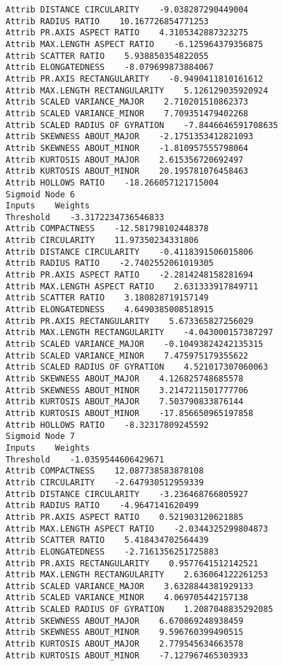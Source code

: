 \documentclass[
	article,			%
	11pt,				%
	oneside,			%
	a4paper,			%
	english,			%
	brazil,				%
	sumario=tradicional
	]{abntex2}
\begin{document}
\begin{lstlisting}
Attrib DISTANCE CIRCULARITY    -9.038287290449004
Attrib RADIUS RATIO    10.167726854771253
Attrib PR.AXIS ASPECT RATIO    4.3105342887323275
Attrib MAX.LENGTH ASPECT RATIO    -6.125964379356875
Attrib SCATTER RATIO    5.938850354822055
Attrib ELONGATEDNESS    -8.079699873884067
Attrib PR.AXIS RECTANGULARITY    -0.9490411810161612
Attrib MAX.LENGTH RECTANGULARITY    5.126129035920924
Attrib SCALED VARIANCE_MAJOR    2.710201510862373
Attrib SCALED VARIANCE_MINOR    7.709351479402268
Attrib SCALED RADIUS OF GYRATION    -7.8446646591708635
Attrib SKEWNESS ABOUT_MAJOR    -2.1751353412821093
Attrib SKEWNESS ABOUT_MINOR    -1.810957555798064
Attrib KURTOSIS ABOUT_MAJOR    2.615356720692497
Attrib KURTOSIS ABOUT_MINOR    20.195781076458463
Attrib HOLLOWS RATIO    -18.266057121715004
Sigmoid Node 6
Inputs    Weights
Threshold    -3.3172234736546833
Attrib COMPACTNESS    -12.581798102448378
Attrib CIRCULARITY    11.97350234331806
Attrib DISTANCE CIRCULARITY    -0.4118391506015806
Attrib RADIUS RATIO    -2.7402552061019305
Attrib PR.AXIS ASPECT RATIO    -2.2814248158281694
Attrib MAX.LENGTH ASPECT RATIO    2.631333917849711
Attrib SCATTER RATIO    3.180828719157149
Attrib ELONGATEDNESS    4.6490385008518915
Attrib PR.AXIS RECTANGULARITY    5.673365827256029
Attrib MAX.LENGTH RECTANGULARITY    -4.043000157387297
Attrib SCALED VARIANCE_MAJOR    -0.10493824242135315
Attrib SCALED VARIANCE_MINOR    7.475975179355622
Attrib SCALED RADIUS OF GYRATION    4.521017307060063
Attrib SKEWNESS ABOUT_MAJOR    4.126825748685578
Attrib SKEWNESS ABOUT_MINOR    3.2147211501777706
Attrib KURTOSIS ABOUT_MAJOR    7.503790833876144
Attrib KURTOSIS ABOUT_MINOR    -17.856650965197858
Attrib HOLLOWS RATIO    -8.32317809245592
Sigmoid Node 7
Inputs    Weights
Threshold    -1.0359544606429671
Attrib COMPACTNESS    12.087738583878108
Attrib CIRCULARITY    -2.647930512959339
Attrib DISTANCE CIRCULARITY    -3.236468766805927
Attrib RADIUS RATIO    -4.9647141620499
Attrib PR.AXIS ASPECT RATIO    0.521903120621885
Attrib MAX.LENGTH ASPECT RATIO    -2.0344325299804873
Attrib SCATTER RATIO    5.418434702564439
Attrib ELONGATEDNESS    -2.7161356251725883
Attrib PR.AXIS RECTANGULARITY    0.9577641512142521
Attrib MAX.LENGTH RECTANGULARITY    2.636064122261253
Attrib SCALED VARIANCE_MAJOR    3.6328844381929133
Attrib SCALED VARIANCE_MINOR    4.069705442157138
Attrib SCALED RADIUS OF GYRATION    1.2087048835292085
Attrib SKEWNESS ABOUT_MAJOR    6.670869248938459
Attrib SKEWNESS ABOUT_MINOR    9.596760399490515
Attrib KURTOSIS ABOUT_MAJOR    2.779545634663578
Attrib KURTOSIS ABOUT_MINOR    -7.127967465303933

\end{lstlisting}
\end{document}
